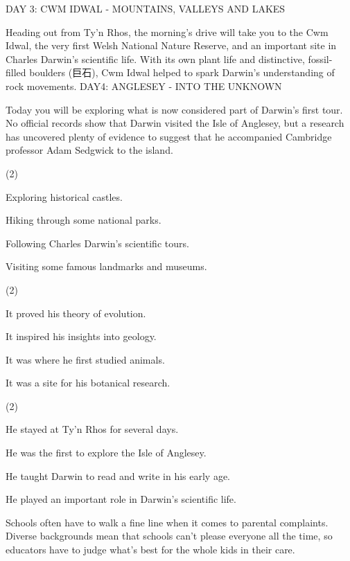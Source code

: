 \documentclass{英语试卷}
\begin{document}
\par DAY 3: CWM IDWAL - MOUNTAINS, VALLEYS AND LAKES\par
\par Heading out from Ty'n Rhos, the morning's drive will take you to the Cwm Idwal, the very first Welsh National Nature Reserve, and an important site in Charles Darwin's scientific life. With its own plant life and distinctive, fossil- filled boulders (巨石), Cwm Idwal helped to spark Darwin's understanding of rock movements. DAY4: ANGLESEY - INTO THE UNKNOWN\par
\par Today you will be exploring what is now considered part of Darwin's first tour. No official records show that Darwin visited the Isle of Anglesey, but a research has uncovered plenty of evidence to suggest that he accompanied Cambridge professor Adam Sedgwick to the island.\par
{}
\begin{choices}(2)
  \item Exploring historical castles.
  \item Hiking through some national parks.
  \item Following Charles Darwin's scientific tours.
  \item Visiting some famous landmarks and museums.
\end{choices}
\begin{choices}(2)
  \item It proved his theory of evolution.
  \item It inspired his insights into geology.
  \item It was where he first studied animals.
  \item It was a site for his botanical research.
\end{choices}
\begin{choices}(2)
  \item He stayed at Ty'n Rhos for several days.
  \item He was the first to explore the Isle of Anglesey.
  \item He taught Darwin to read and write in his early age.
  \item He played an important role in Darwin's scientific life.
\end{choices}
\par Schools often have to walk a fine line when it comes to parental complaints. Diverse backgrounds mean that schools can't please everyone all the time, so educators have to judge what's best for the whole kids in their care.\par
\end{document}
